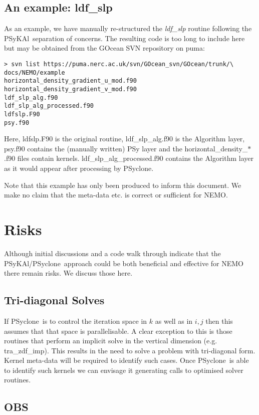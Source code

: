 \documentclass{article}
\newcommand{\psykal}{{PS}y{KA}l}
\newcommand{\psyclone}{{PS}yclone}
\begin{document}
\subsection{An example: ldf\_slp}

As an example, we have manually re-structured the {\it ldf\_slp}
routine following the \psykal\ separation of concerns. The resulting
code is too long to include here but may be obtained from the GOcean
SVN repository on puma:
\begin{verbatim}
> svn list https://puma.nerc.ac.uk/svn/GOcean_svn/GOcean/trunk/\
docs/NEMO/example
horizontal_density_gradient_u_mod.f90
horizontal_density_gradient_v_mod.f90
ldf_slp_alg.f90
ldf_slp_alg_processed.f90
ldfslp.F90
psy.f90
\end{verbatim}

Here, ldfslp.F90 is the original routine, ldf\_slp\_alg.f90 is the
Algorithm layer, psy.f90 contains the (manually written) PSy layer and
the horizontal\_density\_$\ast$.f90 files contain kernels.
ldf\_slp\_alg\_processed.f90 contains the Algorithm layer as it would
appear after processing by \psyclone.

Note that this example has only been produced to inform this
document. We make no claim that the meta-data etc. is correct or
sufficient for NEMO.
 
\section{Risks}

Although initial discussions and a code walk through indicate that the
\psykal/\psyclone\ approach could be both beneficial and effective for
NEMO there remain risks. We discuss those here.

\subsection{Tri-diagonal Solves}

If \psyclone\ is to control the iteration space in $k$ as well as in $i,
j$ then this assumes that that space is parallelisable. A clear
exception to this is those routines that perform an implicit solve in
the vertical dimension (e.g. tra\_zdf\_imp). This results in the need
to solve a problem with tri-diagonal form. Kernel meta-data will be
required to identify such cases. Once \psyclone\ is able to identify
such kernels we can envisage it generating calls to optimised solver
routines.

\subsection{OBS}
\end{document}
